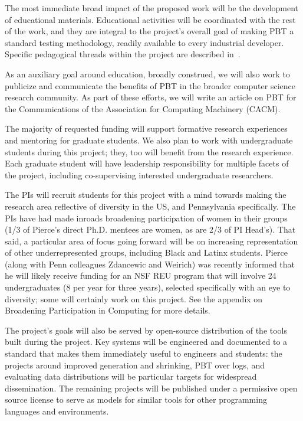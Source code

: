 


%
The most immediate broad impact of the proposed work will be the
development of educational materials. Educational activities will be
coordinated with the rest of the work, and they are integral to the
project's overall goal of making PBT a standard testing methodology,
readily available to every industrial developer.  Specific pedagogical
threads within the project are described in~.

As an auxiliary goal around education, broadly construed, we will also work to
publicize and communicate the benefits of PBT in the broader computer science
research community. As part of these efforts, we will write an article on PBT
for the Communications of the Association for Computing Machinery (CACM).

\smallskip
{}
%
The majority of requested funding will support formative research
experiences and mentoring for graduate students. We
also plan to work with undergraduate students during this project;
they, too will benefit from the research experience. Each graduate
student will have leadership responsibility for multiple facets of the
project, including co-supervising interested undergraduate
researchers.

The PIs will recruit students for this project with a mind towards making
the research area reflective of diversity in the US, and Pennsylvania specifically.
The PIs have had made inroads broadening participation of women in their
groups (1/3 of Pierce's direct Ph.D. mentees are women, as are 2/3 of PI
Head's). That said, a particular area of focus going forward will be on increasing representation of
other underrepresented groups, including Black and Latinx students. Pierce (along with Penn colleagues Zdancewic and Weirich)
was recently informed that he will likely receive funding for an
NSF REU program that will involve 24 undergraduates (8 per
year for three years), selected specifically with an eye to diversity;
some will certainly work on this project. See the appendix on Broadening Participation in Computing for more
details.

\smallskip
{}
%
The project's goals will also be served by open-source distribution of the tools
built during the project. Key systems will be engineered and documented to a standard
that makes them immediately useful to engineers and students: the projects around
improved generation and shrinking, PBT over logs, and evaluating data
distributions will be particular targets for widespread
dissemination. The remaining projects will be published under a permissive
open source license to serve as models for similar tools for other programming languages and environments.

